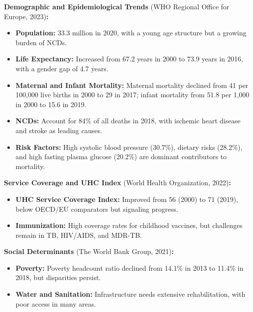 \textbf{Demographic and Epidemiological Trends} (WHO Regional Office for
Europe, 2023)\textbf{:}

\begin{itemize}
\item
  \textbf{Population:} 33.3 million in 2020, with a young age structure
  but a growing burden of NCDs.
\item
  \textbf{Life Expectancy:} Increased from 67.2 years in 2000 to 73.9
  years in 2016, with a gender gap of 4.7 years.
\item
  \textbf{Maternal and Infant Mortality:} Maternal mortality declined
  from 41 per 100,000 live births in 2000 to 29 in 2017; infant
  mortality from 51.8 per 1,000 in 2000 to 15.6 in 2019.
\item
  \textbf{NCDs:} Account for 84\% of all deaths in 2018, with ischemic
  heart disease and stroke as leading causes.
\item
  \textbf{Risk Factors:} High systolic blood pressure (30.7\%), dietary
  risks (28.2\%), and high fasting plasma glucose (20.2\%) are dominant
  contributors to mortality.
\end{itemize}

\textbf{Service Coverage and UHC Index} (World Health Organization,
2022)\textbf{:}

\begin{itemize}
\item
  \textbf{UHC Service Coverage Index:} Improved from 56 (2000) to 71
  (2019), below OECD/EU comparators but signaling progress.
\item
  \textbf{Immunization:} High coverage rates for childhood vaccines, but
  challenges remain in TB, HIV/AIDS, and MDR-TB.
\end{itemize}

\textbf{Social Determinants} (The World Bank Group, 2021)\textbf{:}

\begin{itemize}
\item
  \textbf{Poverty:} Poverty headcount ratio declined from 14.1\% in 2013
  to 11.4\% in 2018, but disparities persist.
\item
  \textbf{Water and Sanitation:} Infrastructure needs extensive
  rehabilitation, with poor access in many areas.
\end{itemize}

